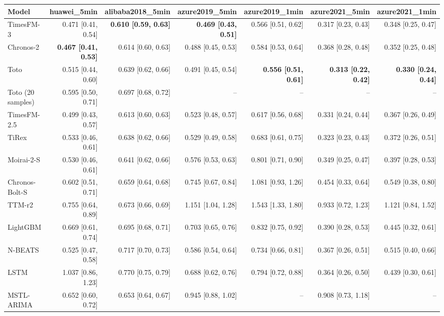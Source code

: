 \begin{tabular}{lrrrrrr}
\toprule
Model & huawei_5min & alibaba2018_5min & azure2019_5min & azure2019_1min & azure2021_5min & azure2021_1min \\
\midrule
TimesFM-3 & 0.471 [0.41, 0.54] & \textbf{0.610 [0.59, 0.63]} & \textbf{0.469 [0.43, 0.51]} & 0.566 [0.51, 0.62] & 0.317 [0.23, 0.43] & 0.348 [0.25, 0.47] \\
Chronos-2 & \textbf{0.467 [0.41, 0.53]} & 0.614 [0.60, 0.63] & 0.488 [0.45, 0.53] & 0.584 [0.53, 0.64] & 0.368 [0.28, 0.48] & 0.352 [0.25, 0.48] \\
Toto & 0.515 [0.44, 0.60] & 0.639 [0.62, 0.66] & 0.491 [0.45, 0.54] & \textbf{0.556 [0.51, 0.61]} & \textbf{0.313 [0.22, 0.42]} & \textbf{0.330 [0.24, 0.44]} \\
Toto (20 samples) & 0.595 [0.50, 0.71] & 0.697 [0.68, 0.72] & – & – & – & – \\
TimesFM-2.5 & 0.499 [0.43, 0.57] & 0.613 [0.60, 0.63] & 0.523 [0.48, 0.57] & 0.617 [0.56, 0.68] & 0.331 [0.24, 0.44] & 0.367 [0.26, 0.49] \\
TiRex & 0.533 [0.46, 0.61] & 0.638 [0.62, 0.66] & 0.529 [0.49, 0.58] & 0.683 [0.61, 0.75] & 0.323 [0.23, 0.43] & 0.372 [0.26, 0.51] \\
Moirai-2-S & 0.530 [0.46, 0.61] & 0.641 [0.62, 0.66] & 0.576 [0.53, 0.63] & 0.801 [0.71, 0.90] & 0.349 [0.25, 0.47] & 0.397 [0.28, 0.53] \\
Chronos-Bolt-S & 0.602 [0.51, 0.71] & 0.659 [0.64, 0.68] & 0.745 [0.67, 0.84] & 1.081 [0.93, 1.26] & 0.454 [0.33, 0.64] & 0.549 [0.38, 0.80] \\
TTM-r2 & 0.755 [0.64, 0.89] & 0.673 [0.66, 0.69] & 1.151 [1.04, 1.28] & 1.543 [1.33, 1.80] & 0.933 [0.72, 1.23] & 1.121 [0.84, 1.52] \\
LightGBM & 0.669 [0.61, 0.74] & 0.695 [0.68, 0.71] & 0.703 [0.65, 0.76] & 0.832 [0.75, 0.92] & 0.390 [0.28, 0.53] & 0.445 [0.32, 0.61] \\
N-BEATS & 0.525 [0.47, 0.58] & 0.717 [0.70, 0.73] & 0.586 [0.54, 0.64] & 0.734 [0.66, 0.81] & 0.367 [0.26, 0.51] & 0.515 [0.40, 0.66] \\
LSTM & 1.037 [0.86, 1.23] & 0.770 [0.75, 0.79] & 0.688 [0.62, 0.76] & 0.794 [0.72, 0.88] & 0.364 [0.26, 0.50] & 0.439 [0.30, 0.61] \\
MSTL-ARIMA & 0.652 [0.60, 0.72] & 0.653 [0.64, 0.67] & 0.945 [0.88, 1.02] & – & 0.908 [0.73, 1.18] & – \\

\end{tabular}
